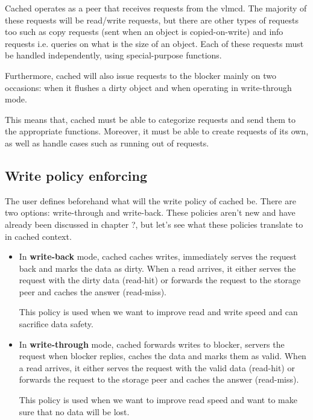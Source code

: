 Cached operates as a peer that receives requests from the vlmcd. The majority of 
these requests will be read/write requests, but there are other types of 
requests too such as copy requests (sent when an object is copied-on-write) and 
info requests i.e. queries on what is the size of an object. Each of these 
requests must be handled independently, using special-purpose functions.

Furthermore, cached will also issue requests to the blocker mainly on two 
occasions: when it flushes a dirty object and when operating in write-through 
mode.

This means that, cached must be able to categorize requests and send them to 
the appropriate functions. Moreover, it must be able to create requests of its 
own, as well as handle cases such as running out of requests.

\subsection{Write policy enforcing}\label{sec:cached-wcp-design}

The user defines beforehand what will the write policy of cached be. There are 
two options: write-through and write-back. These policies aren't new and have 
already been discussed in chapter ?, but let's see what these policies 
translate to in cached context.

\begin{itemize}
	\item
		In \textbf{write-back} mode, cached caches writes, immediately 
		serves the request back and marks the data as dirty. When a read 
		arrives, it either serves the request with the dirty data 
		(read-hit) or forwards the request to the storage peer and 
		caches the answer (read-miss).

		This policy is used when we want to improve read and write speed 
		and can sacrifice data safety.
	\item
		In \textbf{write-through} mode, cached forwards writes to 
		blocker, servers the request when blocker replies, caches the 
		data and marks them as valid.  When a read arrives, it either 
		serves the request with the valid data (read-hit) or forwards 
		the request to the storage peer and caches the answer 
		(read-miss).

		This policy is used when we want to improve read speed and want 
		to make sure that no data will be lost.
\end{itemize}	

